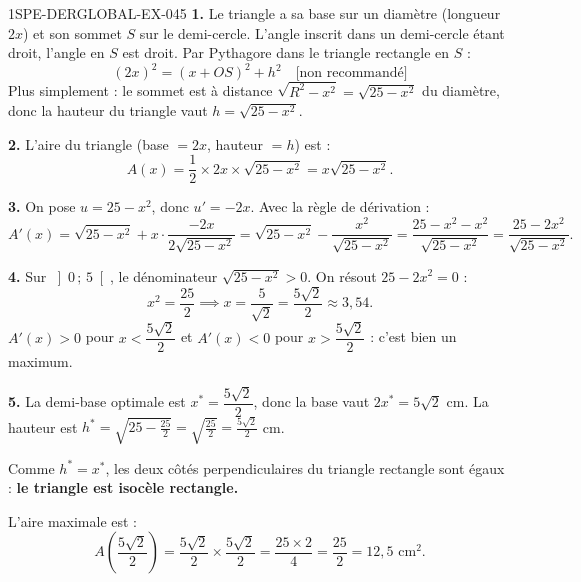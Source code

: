 \begin{corrige}{1SPE-DERGLOBAL-EX-045}
\textbf{1.} Le triangle a sa base sur un diamètre (longueur $2x$) et son sommet $S$ sur le demi-cercle.
L'angle inscrit dans un demi-cercle étant droit, l'angle en $S$ est droit.
Par Pythagore dans le triangle rectangle en $S$ :
\[
(2x)^2 = (x + OS)^2 + h^2 \quad \text{[non recommandé]}
\]
Plus simplement : le sommet est à distance $\sqrt{R^2 - x^2} = \sqrt{25 - x^2}$ du diamètre,
donc la hauteur du triangle vaut $h = \sqrt{25 - x^2}$.

\textbf{2.} L'aire du triangle (base $= 2x$, hauteur $= h$) est :
\[
A(x) = \frac{1}{2} \times 2x \times \sqrt{25 - x^2} = x\sqrt{25 - x^2}.
\]

\textbf{3.} On pose $u = 25 - x^2$, donc $u' = -2x$. Avec la règle de dérivation :
\[
A'(x) = \sqrt{25 - x^2} + x \cdot \frac{-2x}{2\sqrt{25 - x^2}}
       = \sqrt{25 - x^2} - \frac{x^2}{\sqrt{25 - x^2}}
       = \frac{25 - x^2 - x^2}{\sqrt{25 - x^2}}
       = \frac{25 - 2x^2}{\sqrt{25 - x^2}}.
\]

\textbf{4.} Sur $\left]0\,;\,5\right[$, le dénominateur $\sqrt{25 - x^2} > 0$.
On résout $25 - 2x^2 = 0$ :
\[
x^2 = \frac{25}{2} \implies x = \frac{5}{\sqrt{2}} = \frac{5\sqrt{2}}{2} \approx 3{,}54.
\]
$A'(x) > 0$ pour $x < \dfrac{5\sqrt{2}}{2}$ et $A'(x) < 0$ pour $x > \dfrac{5\sqrt{2}}{2}$ :
c'est bien un maximum.

\textbf{5.} La demi-base optimale est $x^* = \dfrac{5\sqrt{2}}{2}$, donc la base vaut $2x^* = 5\sqrt{2}$ cm.
La hauteur est $h^* = \sqrt{25 - \frac{25}{2}} = \sqrt{\frac{25}{2}} = \frac{5\sqrt{2}}{2}$ cm.

Comme $h^* = x^*$, les deux côtés perpendiculaires du triangle rectangle sont égaux :
\textbf{le triangle est isocèle rectangle.}

L'aire maximale est :
\[
A\!\left(\frac{5\sqrt{2}}{2}\right) = \frac{5\sqrt{2}}{2} \times \frac{5\sqrt{2}}{2} = \frac{25 \times 2}{4} = \boxed{\frac{25}{2} = 12{,}5 \text{ cm}^2}.
\]
\end{corrige}
